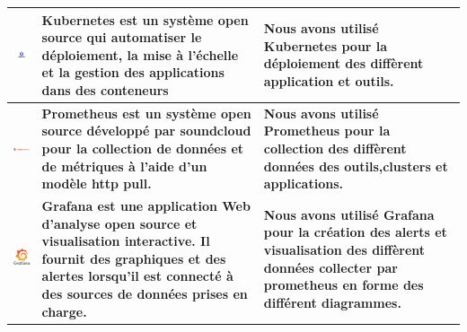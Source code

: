 \begin{center}
\begin{table}[H]
\begin{tabular}{|m{5cm}|m{5cm}|m{5cm}|}
  \hline
\centering\includegraphics[width=4cm,valign=c]{autre_partie/K8s.png}& \textbf{Kubernetes est un système open source qui automatiser le déploiement, la mise à l’échelle et la gestion des applications dans des conteneurs} & \textbf{Nous avons utilisé Kubernetes pour la déploiement des diffèrent application et outils.}  \\
\hline
\centering\includegraphics[width=3cm,valign=c]{autre_partie/prometheus-logo-png-transparent.png}& \textbf{Prometheus est un système open source développé par soundcloud pour la collection de données et de métriques à l’aide d’un modèle http pull. } & \textbf{Nous avons utilisé Prometheus pour la collection des diffèrent données des outils,clusters et applications.}  \\
\hline
\centering\includegraphics[width=2cm,valign=c]{autre_partie/grafana-logo.png}& \textbf{Grafana est une application Web d’analyse open source et visualisation interactive. Il fournit des graphiques et des alertes lorsqu’il est connecté à des sources de données prises en charge. } & \textbf{Nous avons utilisé Grafana pour la création des alerts et visualisation des diffèrent données collecter par prometheus en forme des différent diagrammes.}  \\
\hline

  \end{tabular}
  \end{table}
  \end{center}
